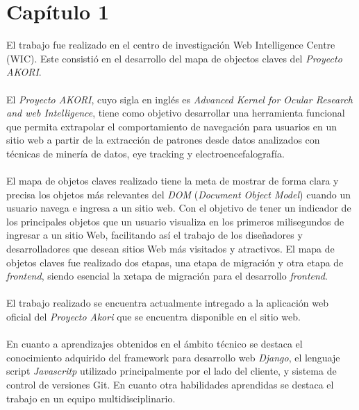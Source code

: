 \documentclass[letterpaper,11pt]{article} %
\begin{document}





\chapter{Capítulo 1}
\begin{resumen}
	El trabajo fue realizado en el centro de investigación Web Intelligence Centre (WIC). Este consistió en el desarrollo del mapa de objectos claves del \textit{Proyecto AKORI}. \\ \\
	El \textit{Proyecto AKORI}, cuyo sigla en inglés es \textit{Advanced Kernel for Ocular Research and web Intelligence}, tiene como objetivo desarrollar una herramienta funcional que permita extrapolar el comportamiento de navegación para usuarios en un sitio web a partir de la extracción
de patrones desde datos analizados con técnicas de minería de datos, eye tracking y electroencefalografía. \\ \\
	El mapa de objetos claves realizado tiene la meta de mostrar de forma clara y precisa los objetos más relevantes del \textit{DOM} (\textit{Document Object Model}) cuando un usuario navega e ingresa a un sitio web. Con el objetivo de tener un indicador de los principales objetos que un usuario visualiza en los primeros milisegundos de ingresar a un sitio Web, facilitando así el trabajo de los diseñadores y desarrolladores que desean sitios Web más visitados y atractivos. El mapa de objetos claves fue realizado dos etapas, una etapa de migración y otra etapa de \textit{frontend}, siendo esencial la xetapa de migración para el desarrollo \textit{frontend}. \\ \\
	El trabajo realizado se encuentra actualmente intregado a la aplicación web oficial del \textit{Proyecto Akori} que se encuentra disponible en el sitio web. \\ \\
	En cuanto a aprendizajes obtenidos en el ámbito técnico se destaca el conocimiento adquirido del framework para desarrollo web \textit{Django}, el lenguaje script \textit{Javascritp} utilizado principalmente por el lado del cliente, y sistema de control de versiones Git. En cuanto otra habilidades aprendidas se destaca el trabajo en un equipo multidisciplinario.
\end{resumen}






\end{document}

